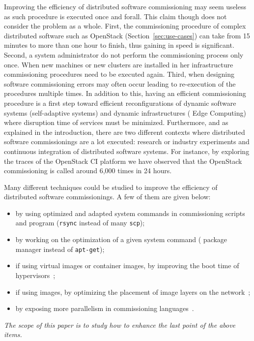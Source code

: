 Improving the efficiency of distributed software commissioning may
seem useless as such procedure is executed once and forall. This claim
though does not consider the problem as a whole.
%
First, the commissioning procedure of complex distributed software
such as OpenStack (Section~\ref{sec:use-cases}) can take from 15
minutes to more than one hour to finish, thus gaining in speed is
significant. Second, a system administrator do not perform the
commissioning process only once. When new machines or new clusters are
installed in her infrastructure commissioning procedures need to be
executed again. Third, when designing software commissioning errors
may often occur leading to re-execution of the procedures multiple
times.
In addition to this, having an efficient commissioning procedure is a
first step toward efficient reconfigurations of dynamic software
systems (\eg self-adaptive systems) and dynamic infrastructures (\eg
Edge Computing) where disruption time of services must be minimized.
Furthermore, and as explained in the introduction, there are two
different contexts where distributed software commissionings are a lot
executed: research or industry experiments and continuous integration
of distributed software systems. For instance, by exploring the traces
of the OpenStack CI platform we have observed that the OpenStack
commissioning is called around 6,000 times in 24 hours.

Many different techniques could be studied to improve the efficiency
of distributed software commissionings. A few of them are given below:
\begin{itemize}
\item by using optimized and adapted system commands in commissioning
  scripts and program (\eg \texttt{rsync} instead of many
  \texttt{scp});
\item by working on the optimization of a given system command (\eg
  \nist package manager instead of \texttt{apt-get});
\item if using virtual images or container images, by improving the
  boot time of hypervisors~\cite{yolo};
\item if using \docker images, by optimizing the placement of image
  layers on the network~\cite{Nitro};
\item by exposing more parallelism in commissioning
  languages~\cite{madeus, aeolus}.
\end{itemize}

\emph{The scope of this paper is to study how to enhance the last point of
the above items.}